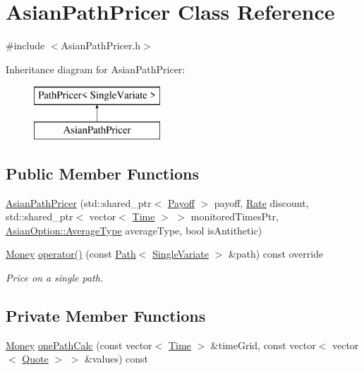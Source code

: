 \hypertarget{class_asian_path_pricer}{}\section{Asian\+Path\+Pricer Class Reference}
\label{class_asian_path_pricer}


{\ttfamily \#include $<$Asian\+Path\+Pricer.\+h$>$}

Inheritance diagram for Asian\+Path\+Pricer\+:\begin{figure}[H]
\begin{center}
\leavevmode
\includegraphics[height=2.000000cm]{class_asian_path_pricer}
\end{center}
\end{figure}
\subsection*{Public Member Functions}
\begin{DoxyCompactItemize}
\item 
\hyperlink{class_asian_path_pricer_a8e295461d8e635e39d8075810bcc1e6a}{Asian\+Path\+Pricer} (std\+::shared\+\_\+ptr$<$ \hyperlink{class_payoff}{Payoff} $>$ payoff, \hyperlink{_name_def_8h_a25bee43a162de339c81f3d1caf6b887d}{Rate} discount, std\+::shared\+\_\+ptr$<$ vector$<$ \hyperlink{_name_def_8h_ac2d3e0ba793497bcca555c7c2cf64ff3}{Time} $>$ $>$ monitored\+Times\+Ptr, \hyperlink{class_asian_option_add7292791bf85820ff9fdbfd4407f3b9}{Asian\+Option\+::\+Average\+Type} average\+Type, bool is\+Antithetic)
\item 
\hyperlink{_name_def_8h_a5a9d48c16a694e9a2d9f1eca730dc8c5}{Money} \hyperlink{class_asian_path_pricer_a929e8a33447f977bfc947e1d5344e353}{operator()} (const \hyperlink{class_path}{Path}$<$ \hyperlink{struct_single_variate}{Single\+Variate} $>$ \&path) const override
\begin{DoxyCompactList}\small\item\em Price on a single path. \end{DoxyCompactList}\end{DoxyCompactItemize}
\subsection*{Private Member Functions}
\begin{DoxyCompactItemize}
\item 
\hyperlink{_name_def_8h_a5a9d48c16a694e9a2d9f1eca730dc8c5}{Money} \hyperlink{class_asian_path_pricer_a33d53acde0a8553f4adcee70c47f50b4}{one\+Path\+Calc} (const vector$<$ \hyperlink{_name_def_8h_ac2d3e0ba793497bcca555c7c2cf64ff3}{Time} $>$ \&time\+Grid, const vector$<$ vector$<$ \hyperlink{_name_def_8h_a642a6c5fd87319d922637de0e0bb0305}{Quote} $>$ $>$ \&values) const
\end{DoxyCompactItemize}
